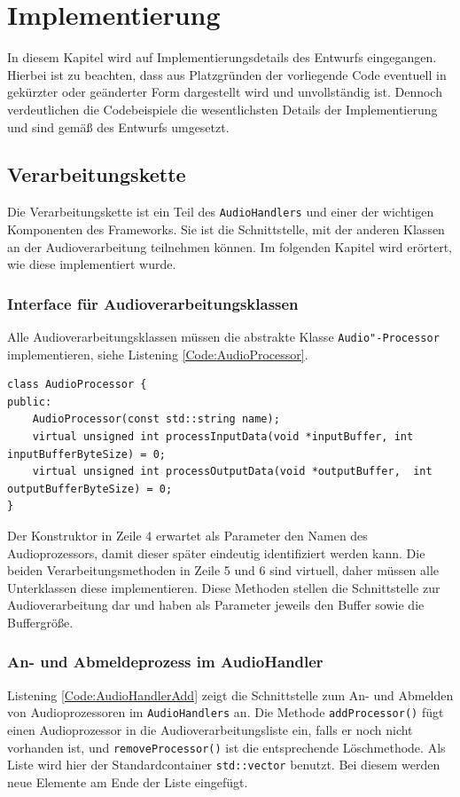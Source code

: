 \chapter{Implementierung}
In diesem Kapitel wird auf Implementierungsdetails des Entwurfs eingegangen. Hierbei ist zu beachten, dass aus Platzgründen der vorliegende Code eventuell in gekürzter oder geänderter Form dargestellt wird und unvollständig ist. Dennoch verdeutlichen die Codebeispiele die wesentlichsten Details der Implementierung und sind gemäß des Entwurfs umgesetzt.

\section{Verarbeitungskette}
Die Verarbeitungskette ist ein Teil des \texttt{AudioHandlers} und einer der wichtigen Komponenten des Frameworks. Sie ist die Schnittstelle, mit der anderen Klassen an der Audioverarbeitung teilnehmen können. Im folgenden Kapitel wird erörtert, wie diese implementiert wurde.

\subsection{Interface für Audioverarbeitungsklassen}
Alle Audioverarbeitungsklassen müssen die abstrakte Klasse \texttt{Audio"-Processor} implementieren, siehe Listening \ref{Code:AudioProcessor}.

\begin{lstlisting}[caption={Interface des AudioProcessors},label={Code:AudioProcessor}]
class AudioProcessor {
public:
	AudioProcessor(const std::string name);
	virtual unsigned int processInputData(void *inputBuffer, int inputBufferByteSize) = 0;
	virtual unsigned int processOutputData(void *outputBuffer,  int outputBufferByteSize) = 0;
}
\end{lstlisting}
Der Konstruktor in Zeile 4 erwartet als Parameter den Namen des Audioprozessors, damit dieser später eindeutig identifiziert werden kann. Die beiden Verarbeitungsmethoden in Zeile 5 und 6 sind virtuell, daher müssen alle Unterklassen diese implementieren. Diese Methoden stellen die Schnittstelle zur Audioverarbeitung dar und haben als Parameter jeweils den Buffer sowie die Buffergröße.

\subsection{An- und Abmeldeprozess im AudioHandler}
Listening \ref{Code:AudioHandlerAdd} zeigt die Schnittstelle zum An- und Abmelden von Audioprozessoren im \texttt{AudioHandlers} an. Die Methode \texttt{addProcessor()} fügt einen Audioprozessor in die Audioverarbeitungsliste ein, falls er noch nicht vorhanden ist, und \texttt{removeProcessor()} ist die entsprechende Löschmethode. Als Liste wird hier der Standardcontainer \texttt{std::vector} benutzt. Bei diesem werden neue Elemente am Ende der Liste eingefügt.


